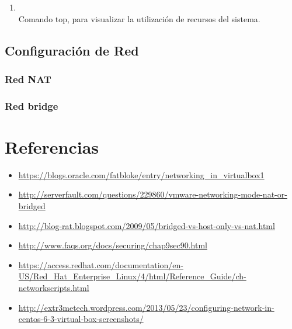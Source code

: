 \documentclass[11pt]{article}
\begin{document}
\begin{enumerate}
		    \item
	        	\begin{minipage}[t]{\linewidth}
			        \raggedright
			        \medskip
			        \\Comando top, para visualizar la utilización de recursos del sistema.
		        \end{minipage}

		\end{enumerate}
\subsection{Configuración de Red}
\subsubsection{Red NAT}
\subsubsection{Red bridge}


\section{Referencias}
	\begin{itemize}
		\item \url{https://blogs.oracle.com/fatbloke/entry/networking_in_virtualbox1}
		\item \url{http://serverfault.com/questions/229860/vmware-networking-mode-nat-or-bridged}
		\item \url{http://blog-rat.blogspot.com/2009/05/bridged-vs-host-only-vs-nat.html}
		\item \url{http://www.faqs.org/docs/securing/chap9sec90.html}
		\item \scriptsize \url{https://access.redhat.com/documentation/en-US/Red_Hat_Enterprise_Linux/4/html/Reference_Guide/ch-networkscripts.html}
		\item \scriptsize \url{http://extr3metech.wordpress.com/2013/05/23/configuring-network-in-centos-6-3-virtual-box-screenshots/}
	\end{itemize}
\end{document}
